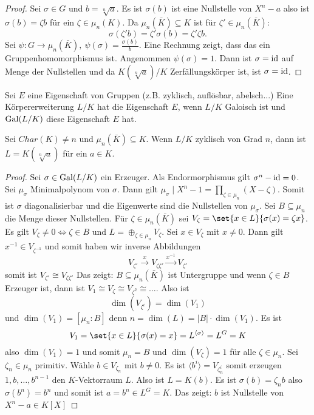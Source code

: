 \begin{proof}
    Sei \(\sigma\in G\) und \(b=\sqrt[n]{a}\). Es ist \(\sigma(b)\) ist eine Nullstelle von \(X^n-a\) also ist \(\sigma(b)=\zeta b\) für ein \(\zeta\in\mu_n(K)\).
    Da \(\mu_n(\bar K)\subseteq K\) ist für \(\zeta'\in\mu_n(\bar K):\)
    \[\sigma(\zeta'b)=\zeta'\sigma(b)=\zeta'\zeta b.\]
    Sei \(\psi\colon G\to \mu_n(\bar K), \ \psi(\sigma)=\frac{\sigma(b)}{b}\). Eine Rechnung zeigt, dass das ein Gruppenhomomorphismus ist. Angenommen \(\psi(\sigma)=1\).
    Dann ist \(\sigma=\mathrm{id}\) auf Menge der Nullstellen und da \(K(\sqrt[n]{a})/K\) Zerfällungskörper ist, ist \(\sigma=\mathrm{id}\).
\end{proof}
\begin{Def}
    Sei \(E\) eine Eigenschaft von Gruppen (z.B. zyklisch, auflösbar, abelsch...) Eine Körpererweiterung \(L/K\) hat die Eigenschaft \(E\), wenn \(L/K\) Galoisch ist und \(\operatorname{Gal}(L/K)\) diese Eigenschaft \(E\) hat.
\end{Def}
\begin{Satz}\label{Satz:ZyklWurzel}
    Sei \(Char(K)\neq n\) und \(\mu_n(\bar K)\subseteq K\). Wenn \(L/K\) zyklisch von Grad \(n\), dann ist \(L=K(\sqrt[n]{a})\) für ein \(a\in K\).
\end{Satz}
\begin{proof}
    Sei \(\sigma\in\operatorname{Gal}(L/K)\) ein Erzeuger. Als Endormorphismus gilt \(\sigma^n-\mathrm{id}=0\). Sei \(\mu_\sigma\) Minimalpolynom von \(\sigma\).
    Dann gilt \(\mu_\sigma\mid X^n-1=\prod_{\zeta\in\mu_n}(X-\zeta)\). Somit ist \(\sigma\) diagonalisierbar und die Eigenwerte sind die Nullstellen von \(\mu_\sigma\). Sei \(B\subseteq \mu_n\) die Menge dieser Nullstellen. Für \(\zeta\in \mu_n(\bar K)\) sei \(V_\zeta=\set{x\in L}{ \sigma(x)=\zeta x}\). Es gilt \(V_\zeta\neq 0\iff \zeta\in B\) und
    \(L=\oplus_{\zeta\in\mu_n}V_\zeta\).
    Sei \(x\in V_\zeta\) mit \(x\neq 0\). Dann gilt \(x^{-1}\in V_{\zeta^{-1}}\) und somit haben wir inverse Abbildungen 
    \[V_{\zeta'}\stackrel{x}\to V_{\zeta\zeta'}\stackrel{x^{-1}}\to V_{\zeta'}\] somit ist \(V_{\zeta'}\cong V_{\zeta\zeta'}\)
    Das zeigt: \(B\subseteq \mu_n(\bar K)\) ist Untergruppe und wenn \(\zeta\in B\) Erzeuger ist, dann  ist \(V_1\cong V_\zeta\cong V_{\zeta^2}\cong\dots\).
    Also ist \[\dim(V_{\zeta^i})=\dim(V_1)\] und \(\dim(V_1)=[\mu_n:B]\) denn \(n=\dim(L)=|B|\cdot \dim(V_1)\).
    Es ist 
    \[V_1=\set{x\in L}{ \sigma(x)=x}=L^{\langle \sigma\rangle}=L^G=K\] also \(\dim(V_1)=1\) und somit \(\mu_n=B\) und \(\dim(V_\zeta)=1\) für alle \(\zeta\in\mu_n\).
    Sei \(\zeta_n\in\mu_n\) primitiv. Wähle \(b\in V_{\zeta_n}\) mit \(b\neq 0\). Es ist \(\langle b^i\rangle=V_{\zeta_n^i}\) somit erzeugen \(1,b,\dots, b^{n-1}\) den \(K\)-Vektorraum \(L\). Also ist \(L=K(b)\).
    Es ist \(\sigma(b)=\zeta_nb\) also \(\sigma(b^n)=b^n\) und somit ist \(a=b^n\in L^G=K\). Das zeigt: \(b\) ist Nullstelle von \(X^n-a\in K[X]\)
\end{proof}
